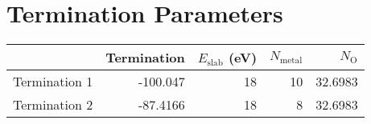 \documentclass{article}
\begin{document}
\section*{Termination Parameters}
\begin{tabular}{lrrrr}
\hline
               &   Termination &   $E_{\mathrm{slab}}$ (eV) &   $N_{\mathrm{metal}}$ &   $N_\mathrm{O}$ \\
\hline
 Termination 1 &     -100.047  &                         18 &                     10 &          32.6983 \\
 Termination 2 &      -87.4166 &                         18 &                      8 &          32.6983 \\
\hline
\end{tabular}
\end{document}
